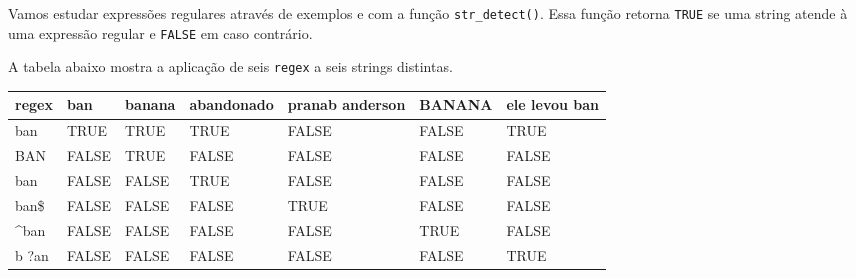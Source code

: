 \documentclass[]{book}
\newenvironment{Shaded}{\begin{snugshade}}{\end{snugshade}}
\newcommand{\KeywordTok}[1]{\textcolor[rgb]{0.13,0.29,0.53}{\textbf{{#1}}}}
\newcommand{\DataTypeTok}[1]{\textcolor[rgb]{0.13,0.29,0.53}{{#1}}}
\newcommand{\StringTok}[1]{\textcolor[rgb]{0.31,0.60,0.02}{{#1}}}
\newcommand{\CommentTok}[1]{\textcolor[rgb]{0.56,0.35,0.01}{\textit{{#1}}}}
\newcommand{\OtherTok}[1]{\textcolor[rgb]{0.56,0.35,0.01}{{#1}}}
\newcommand{\NormalTok}[1]{{#1}}
\begin{document}
Vamos estudar expressões regulares através de exemplos e com a função
\texttt{str\_detect()}. Essa função retorna \texttt{TRUE} se uma string
atende à uma expressão regular e \texttt{FALSE} em caso contrário.

A tabela abaixo mostra a aplicação de seis \texttt{regex} a seis strings
distintas.

\begin{Shaded}
\end{Shaded}

\begin{tabular}{l|l|l|l|l|l|l}
\hline
regex & ban & banana & abandonado & pranab anderson & BANANA & ele levou ban\\
\hline
ban & TRUE & TRUE & TRUE & FALSE & FALSE & TRUE\\
\hline
BAN & FALSE & TRUE & FALSE & FALSE & FALSE & FALSE\\
\hline
ban & FALSE & FALSE & TRUE & FALSE & FALSE & FALSE\\
\hline
ban\$ & FALSE & FALSE & FALSE & TRUE & FALSE & FALSE\\
\hline
\textasciicircum{}ban & FALSE & FALSE & FALSE & FALSE & TRUE & FALSE\\
\hline
b ?an & FALSE & FALSE & FALSE & FALSE & FALSE & TRUE\\
\hline
\end{tabular}
\end{document}
